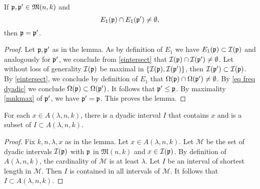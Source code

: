 \begin{lemma}\label{pairwise disjoint}
     If $\mathfrak p, \mathfrak p' \in {\mathfrak{M}}(n,k)$ and
     \begin{equation}\label{eintersect}
     {E_1}(\mathfrak p)\cap {E_1}(\mathfrak p')\neq \emptyset,
     \end{equation}
     then $\mathfrak p=\mathfrak p'$.
\end{lemma}
\begin{proof}
Let $\mathfrak p,\mathfrak p'$ as in the lemma. As by definition of $E_1$
we have
$E_1(\mathfrak p)\subset \mathcal{I}(\mathfrak p)$ and analogously for $\mathfrak p'$, we conclude from \eqref{eintersect} that  $\mathcal{I}(\mathfrak p)\cap \mathcal{I}(\mathfrak p')\neq \emptyset$. Let without loss of generality $\mathcal{I}(\mathfrak p)$ be maximal in
$\{\mathcal{I}(\mathfrak p),\mathcal{I}(\mathfrak p')\}$, then $\mathcal{I}(\mathfrak p')\subset \mathcal{I}(\mathfrak p)$.
By \eqref{eintersect}, we conclude by definition of $E_1$ that $\Omega(\mathfrak p)\cap \Omega(\mathfrak p')\neq \emptyset$. By
\eqref{eq freq dyadic} we conclude $\Omega(\mathfrak p)\subset \Omega(\mathfrak p')$. It follows that $\mathfrak p'\le \mathfrak p$. By maximality
\eqref{mnkmax}
of $\mathfrak p'$, we have $\mathfrak p'=\mathfrak p$. This proves the lemma.
\end{proof}


\begin{lemma}\label{adyadic}
For each  $x\in A(\lambda,n,k)$,
there is a dyadic interval $I$
that contains $x$ and is
a subset of
$I\subset A(\lambda,n,k)$.
\end{lemma}

\begin{proof}

Fix $k,n,\lambda,x$ as in the lemma.
Let  $x\in A(\lambda,n,k)$. Let
$\mathcal{M}$ be the set of dyadic intervals
 $\mathcal{I}(\mathfrak p)$
with $\mathfrak p$ in  $\mathfrak{M}(n,k)$
and $x\in \mathcal{I}(\mathfrak p)$. By definition of
$A(\lambda,n,k)$, the cardinality of $\mathcal{M}$
is at least $\lambda$. Let $I$ be an interval of
shortest length in $\mathcal{M}$. Then
$I$ is contained in all intervals of $\mathcal{M}$.
It follows that $I\subset A(\lambda,n,k)$.
\end{proof}

